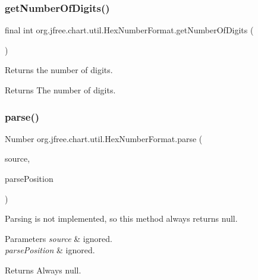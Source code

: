 \subsubsection{\texorpdfstring{get\+Number\+Of\+Digits()}{getNumberOfDigits()}}
{\footnotesize\ttfamily final int org.\+jfree.\+chart.\+util.\+Hex\+Number\+Format.\+get\+Number\+Of\+Digits (\begin{DoxyParamCaption}{ }\end{DoxyParamCaption})}

Returns the number of digits.

\begin{DoxyReturn}{Returns}
The number of digits. 
\end{DoxyReturn}
\mbox{\label{classorg_1_1jfree_1_1chart_1_1util_1_1_hex_number_format_ab6c821389cd089b7b5beb129be0e2fbc}} 
\subsubsection{\texorpdfstring{parse()}{parse()}}
{\footnotesize\ttfamily Number org.\+jfree.\+chart.\+util.\+Hex\+Number\+Format.\+parse (\begin{DoxyParamCaption}\item[{String}]{source,  }\item[{Parse\+Position}]{parse\+Position }\end{DoxyParamCaption})}

Parsing is not implemented, so this method always returns {\ttfamily null}.


\begin{DoxyParams}{Parameters}
{\em source} & ignored. \\
\hline
{\em parse\+Position} & ignored.\\
\hline
\end{DoxyParams}
\begin{DoxyReturn}{Returns}
Always {\ttfamily null}. 
\end{DoxyReturn}
\mbox{\label{classorg_1_1jfree_1_1chart_1_1util_1_1_hex_number_format_a134b4b389c64ecf6fbe95a5131ccc5eb}} 
